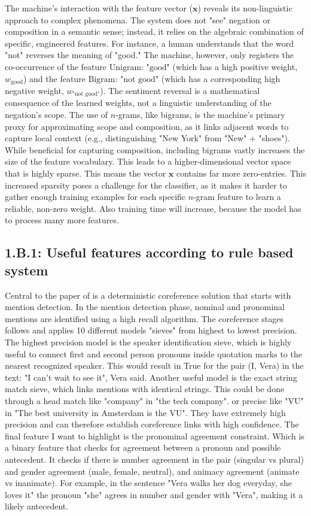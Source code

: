 \documentclass[11pt]{article}
\begin{document}
The machine's interaction with the feature vector ($\mathbf{x}$) reveals its non-linguistic approach to complex phenomena.
The system does not "see" negation or composition in a semantic sense; instead, it relies on the algebraic combination of specific, engineered features.
For instance, a human understands that the word "not" reverses the meaning of "good."
The machine, however, only registers the co-occurrence of the feature $\text{Unigram: "good"}$ (which has a high positive weight, $w_{\text{good}}$) and the feature $\text{Bigram: "not good"}$ (which has a corresponding high negative weight, $w_{\text{"not good"}}$).
The sentiment reversal is a mathematical consequence of the learned weights, not a linguistic understanding of the negation's scope.
The use of $n$-grams, like bigrams, is the machine's primary proxy for approximating scope and composition, as it links adjacent words to capture local context (e.g., distinguishing "New York" from "New" + "shoes").
While beneficial for capturing composition, including bigrams vastly increases the size of the feature vocabulary.
This leads to a higher-dimensional vector space that is highly sparse.
This means the vector $\mathbf{x}$ contains far more zero-entries.
This increased sparsity poses a challenge for the classifier, as it makes it harder to gather enough training examples for each specific $n$-gram feature to learn a reliable, non-zero weight.
Also training time will increase, because the model has to process many more features.

\subsection*{1.B.1: Useful features according to rule based system}
Central to the paper of \cite{lee-etal-2013-deterministic} is a deterministic coreference solution that starts with mention detection.
In the mention detection phase, nominal and pronominal mentions are identified using a high recall algorithm.
The coreference stages follows and applies 10 different models "sieves"  from highest to lowest precision.
The highest precision model is the speaker identification sieve, which is highly useful to connect first and second person pronouns inside quotation marks to the nearest recognized speaker.
This would result in True for the pair (I, Vera) in the text: "I can't wait to see it", Vera said.
Another useful model is the exact string match sieve, which links mentions with identical strings.
This could be done through a head match like "company" in "the tech company". or precise like "VU" in "The best university in Amsterdam is the VU".
They have extremely high precision and can therefore establish coreference links with high confidence.
The final feature I want to highlight is the pronominal agreement constraint. Which is a binary feature that checks for agreement between a pronoun and possible antecedent.
It checks if there is number agreement in the pair (singular vs plural) and gender agreement (male, female, neutral), and animacy agreement (animate vs inanimate).
For example, in the sentence "Vera walks her dog everyday, she loves it" the pronoun "she" agrees in number and gender with "Vera", making it a likely antecedent.
\end{document}
